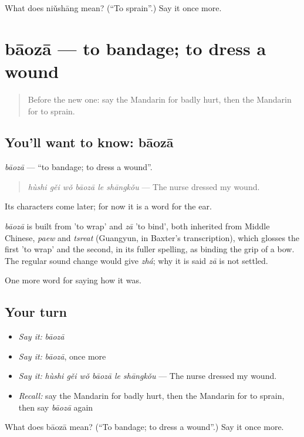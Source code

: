 \begin{tcolorbox}[breakable,colback=teal!4,colframe=teal!35!black,title={Before you move on}]
What does niǔshāng mean? (\textquotedblleft{}To sprain\textquotedblright{}.) Say it once more.
\end{tcolorbox}
\section[bāozā]{bāozā — to bandage; to dress a wound}

\label{lesson:ZH-C478-baoza}



\begin{quote}
Before the new one: say the Mandarin for badly hurt, then the Mandarin for to sprain.
\end{quote}

\subsection*{You'll want to know: bāozā}
\emph{bāozā} — \textquotedblleft{}to bandage; to dress a wound\textquotedblright{}.

\begin{quote}
\emph{hùshi gěi wǒ bāozā le shāngkǒu} — The nurse dressed my wound.
\end{quote}

Its characters come later; for now it is a word for the ear.

\begin{cousinweb}
\emph{bāozā} is built from  'to wrap' and \emph{zā} 'to bind', both inherited from Middle Chinese, \emph{paew} and \emph{tsreat} (Guangyun, in Baxter's transcription), which glosses the first 'to wrap' and the second, in its fuller spelling, as binding the grip of a bow. The regular sound change would give \emph{zhá}; why it is said \emph{zā} is not settled.
\end{cousinweb}

\begin{grammarlens}[title={What you've built}]
One more word for saying how it was.
\end{grammarlens}

\subsection*{Your turn}
\begin{itemize}
\raggedright
  \item \emph{Say it:} \emph{bāozā}
  \item \emph{Say it:} \emph{bāozā}, once more
  \item \emph{Say it:} \emph{hùshi gěi wǒ bāozā le shāngkǒu} — The nurse dressed my wound.
  \item \emph{Recall:} say the Mandarin for badly hurt, then the Mandarin for to sprain, then say \emph{bāozā} again
\end{itemize}

\begin{tcolorbox}[breakable,colback=teal!4,colframe=teal!35!black,title={Before you move on}]
What does bāozā mean? (\textquotedblleft{}To bandage; to dress a wound\textquotedblright{}.) Say it once more.
\end{tcolorbox}

